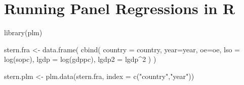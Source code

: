 \documentclass[landscape,letterpaper,9pt]{article}
\begin{document}
\section{Running Panel Regressions in R}
\begin{CVerbatim}
library(plm)

stern.fra <- data.frame(
    cbind(
    country = country,
    year=year,
    oe=oe,
    lso = log(sopc),
    lgdp = log(gdppc),
    lgdp2 = lgdp^2
    )
)

stern.plm <- plm.data(stern.fra, index = c("country","year"))

\end{CVerbatim}
\newpage
%
\newpage
\end{document}

